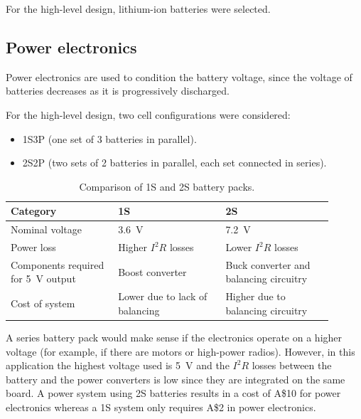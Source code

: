 \documentclass{report}
\newcommand{\aud}{A\$}
\begin{document}
For the high-level design, lithium-ion batteries were selected.

\subsection{Power electronics}
Power electronics are used to condition the battery voltage, since the voltage of batteries decreases as it is progressively discharged.

For the high-level design, two cell configurations were considered:
\begin{itemize}
  \item 1S3P (one set of 3 batteries in parallel).
  \item 2S2P (two sets of 2 batteries in parallel, each set connected in series).
\end{itemize}

\begin{table}[H]
  \centering
  \begin{tabular}{|p{0.3\linewidth}|p{0.3\linewidth}|p{0.3\linewidth}|}
    \hline
    \textbf{Category}                            & \textbf{1S}                    & \textbf{2S}                            \\
    \hline
    Nominal voltage                              & \SI{3.6}{\volt}                & \SI{7.2}{\volt}                        \\
    Power loss                                   & Higher $I^2R$ losses           & Lower $I^2R$ losses                    \\
    Components required for \SI{5}{\volt} output & Boost converter                & Buck converter and balancing circuitry \\
    Cost of system                               & Lower due to lack of balancing & Higher due to balancing circuitry      \\
    \hline
  \end{tabular}
  \caption{Comparison of 1S and 2S battery packs.}
  \label{tabl:battery-1s2s-comparison}
\end{table}

A series battery pack would make sense if the electronics operate on a higher voltage (for example, if there are motors or high-power radios). However, in this application the highest voltage used is \SI{5}{\volt} and the $I^2R$ losses between the battery and the power converters is low since they are integrated on the same board. A power system using 2S batteries results in a cost of \aud 10 for power electronics whereas a 1S system only requires \aud 2 in power electronics.
\end{document}

